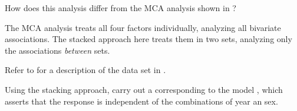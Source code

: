 \documentclass[10pt]{report}\usepackage[]{graphicx}\usepackage[]{color}
\makeatletter
\newcommand{\hlnum}[1]{\textcolor[rgb]{0.686,0.059,0.569}{#1}}%
\newcommand{\hlstr}[1]{\textcolor[rgb]{0.192,0.494,0.8}{#1}}%
\newcommand{\hlcom}[1]{\textcolor[rgb]{0.678,0.584,0.686}{\textit{#1}}}%
\newcommand{\hlopt}[1]{\textcolor[rgb]{0,0,0}{#1}}%
\newcommand{\hlstd}[1]{\textcolor[rgb]{0.345,0.345,0.345}{#1}}%
\newcommand{\hlkwb}[1]{\textcolor[rgb]{0.69,0.353,0.396}{#1}}%
\newcommand{\hlkwc}[1]{\textcolor[rgb]{0.333,0.667,0.333}{#1}}%
\newcommand{\hlkwd}[1]{\textcolor[rgb]{0.737,0.353,0.396}{\textbf{#1}}}%
\newenvironment{kframe}{%
 \def\at@end@of@kframe{}%
 \ifinner\ifhmode%
  \def\at@end@of@kframe{\end{minipage}}%
  \begin{minipage}{\columnwidth}%
 \fi\fi%
 \def\FrameCommand##1{\hskip\@totalleftmargin \hskip-\fboxsep
 \colorbox{shadecolor}{##1}\hskip-\fboxsep
     \hskip-\linewidth \hskip-\@totalleftmargin \hskip\columnwidth}%
 \MakeFramed {\advance\hsize-\width
   \@totalleftmargin\z@ \linewidth\hsize
   \@setminipage}}%
 {\par\unskip\endMakeFramed%
 \at@end@of@kframe}
\newenvironment{knitrout}{}{} %
\renewenvironment{knitrout}{\small\renewcommand{\baselinestretch}{.85}}{} %
\makeatother
\begin{document}
\begin{Exercises}
\begin{enumerate*}
  	  
  	  \item How does this analysis differ from the MCA analysis shown in ?
  	  \begin{ans}
  	  The MCA analysis treats all four factors individually, analyzing all bivariate associations.
  	  The stacked approach here treats them in two sets, analyzing only the associations \emph{between}
  	  sets.
  	  \end{ans}
  	   
  \end{enumerate*}

\exercise\label{lab:ca-vietnam} Refer to  for a description of the  data set
  in . 
  \begin{enumerate*}
    \item Using the stacking approach, carry out a \ca corresponding to the \loglin model , which asserts
    that the response is independent of the combinations of year an sex.  
    \begin{ans}
    \end{ans}
    

\end{enumerate*}
\end{Exercises}
\end{document}
